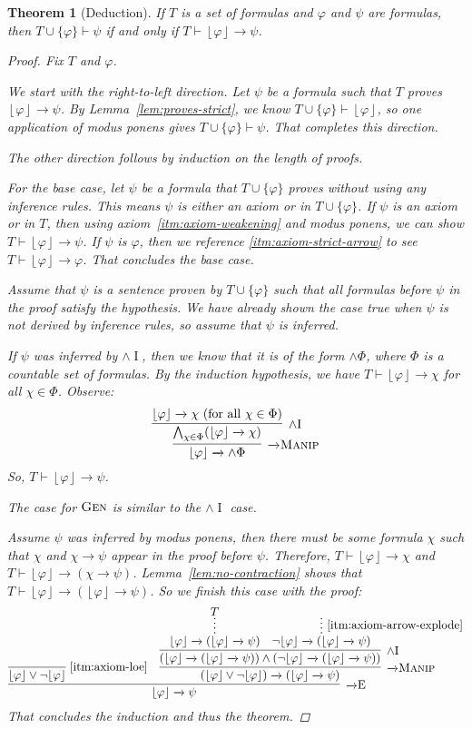 \documentclass{amsart}
\newtheorem{theorem}{Theorem}[section]
\theoremstyle{definition}
\numberwithin{equation}{theorem}
\renewcommand{\phi}{\varphi}
\newcommand{\unwedge}{{\wedge}}
\newcommand{\proves}{\vdash}
\newcommand{\strict}[1]{{\left\lfloor#1\right\rfloor}}
\newcommand{\narrow}[1]{\xrightarrow{#1}}
\renewcommand{\to}{\narrow{}}
\newcommand{\arr}{{\to}}
\newcommand{\intro}{\!\operatorname{I}}
\newcommand{\elim}{\!\operatorname{E}}
\newcommand{\aref}[1]{\!\text{\ref{itm:axiom-#1}}}
\newcommand{\pushdown}{\arr\text{\sc{Manip}}}
\newcommand{\generalization}{\text{\sc{Gen}}}
\begin{document}
\begin{theorem}[Deduction]\label{thm:deduction}
  If $T$ is a set of formulas and $\phi$ and $\psi$ are formulas, then $T\cup\{\phi\}\proves\psi$ if and only if $T\proves\strict\phi\to\psi$.
  \begin{proof}
    Fix $T$ and $\phi$.
  
    We start with the right-to-left direction.
    Let $\psi$ be a formula such that $T$ proves $\strict\phi\to\psi$.
    By Lemma~\ref{lem:proves-strict}, we know $T\cup\{\phi\}\proves\strict\phi$, so one application of modus ponens gives $T\cup\{\phi\}\proves\psi$.
    That completes this direction.
    
    The other direction follows by induction on the length of proofs.
    
    For the base case, let $\psi$ be a formula that $T\cup\{\phi\}$ proves without using any inference rules.
    This means $\psi$ is either an axiom or in $T\cup\{\phi\}$.
    If $\psi$ is an axiom or in $T$, then using axiom~\ref{itm:axiom-weakening} and modus ponens, we can show $T\proves\strict\phi\to\psi$.
    If $\psi$ is $\phi$, then we reference \ref{itm:axiom-strict-arrow} to see $T\proves\strict\phi\to\phi$.
    That concludes the base case.
    
    Assume that $\psi$ is a sentence proven by $T\cup\{\phi\}$ such that all formulas before $\psi$ in the proof satisfy the hypothesis.
    We have already shown the case true when $\psi$ is not derived by inference rules, so assume that $\psi$ is inferred.

    If $\psi$ was inferred by $\unwedge\intro$, then we know that it is of the form $\unwedge\Phi$, where $\Phi$ is a countable set of formulas.
    By the induction hypothesis, we have $T\proves\strict\phi\to\chi$ for all $\chi\in\Phi$.
    Observe:
    \[
      \infer[\pushdown]{\strict\phi\to\unwedge\Phi}{
        \infer[\unwedge\intro]{\bigwedge_{\chi\in\Phi}(\strict\phi\to\chi)}{
          \strict\phi\to\chi\text{ (for all $\chi\in\Phi$)}
        }
      }
    \]
    So, $T\proves\strict\phi\to\psi$.
    
    The case for $\generalization$ is similar to the $\unwedge\intro$ case.
    
    Assume $\psi$ was inferred by modus ponens, then there must be some formula $\chi$ such that $\chi$ and $\chi\to\psi$ appear in the proof before $\psi$.
    Therefore, $T\proves\strict\phi\to\chi$ and $T\proves\strict\phi\to(\chi\to\psi)$.
    Lemma~\ref{lem:no-contraction} shows that $T\proves\strict\phi\to(\strict\phi\to\psi)$.
    So we finish this case with the proof:
    \[
      \infer[\arr\elim]{\strict\phi\to\psi}{
        \infer[\aref{loe}]{\strict\phi\vee\neg\strict\phi}{} &
        \infer[\pushdown]{(\strict\phi\vee\neg\strict\phi)\to(\strict\phi\to\psi)}{
          \infer[\unwedge\intro]{(\strict\phi\to(\strict\phi\to\psi))\wedge(\neg\strict\phi\to(\strict\phi\to\psi))}{
            \infer*{\strict\phi\to(\strict\phi\to\psi)}{T} &
            \infer*[\aref{arrow-explode}]{\neg\strict\phi\to(\strict\phi\to\psi)}{}
          }
        }
      }
    \]
    That concludes the induction and thus the theorem.
  \end{proof}
\end{theorem}
\end{document}
